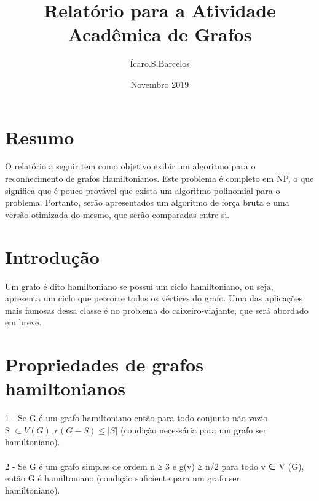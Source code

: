 \documentclass{article}
\title{Relatório para a Atividade Acadêmica de Grafos}
\author{Ícaro.S.Barcelos}
\date{Novembro 2019}
\begin{document}
\maketitle

\section{Resumo}

\hspace{\parindent}O relatório a seguir tem como objetivo exibir um algoritmo para o reconhecimento de grafos Hamiltonianos. Este problema é completo em NP, o que significa que é pouco provável que exista um algoritmo polinomial para o\\ problema. Portanto, serão apresentados um algoritmo de força bruta e uma versão otimizada do mesmo, que serão comparadas entre si.\par

\pagebreak
\section{Introdução}
\hspace{\parindent}Um grafo é dito hamiltoniano se possui um ciclo hamiltoniano, ou seja,\\ apresenta um ciclo que percorre todos os vértices do grafo. Uma das aplicações mais famosas dessa classe é no problema do caixeiro-viajante, que será abordado em breve.\par

\section{Propriedades de grafos hamiltonianos}
1 - Se G é um grafo hamiltoniano então para todo conjunto não-vazio \\S $\subset V (G), c(G - S) ≤ |S| $ (condição necessária para um grafo ser hamiltoniano).\\
\\2 - Se G é um grafo simples de ordem n ≥ 3 e g(v) ≥ n/2 para todo v ∈ V (G), então G é hamiltoniano (condição suficiente para um grafo ser \\hamiltoniano).\\
\end{document}
